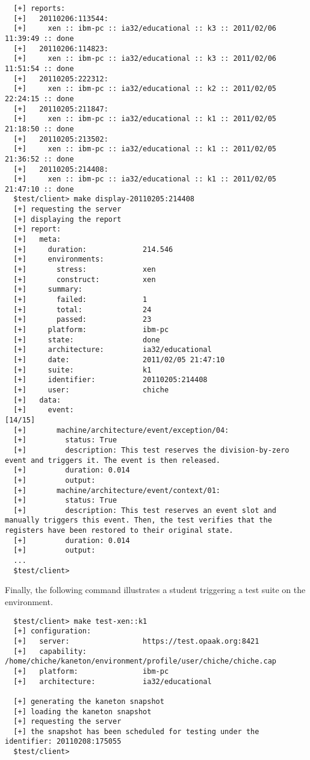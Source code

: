 \begin{verbatim}
  [+] reports:
  [+]   20110206:113544:
  [+]     xen :: ibm-pc :: ia32/educational :: k3 :: 2011/02/06 11:39:49 :: done
  [+]   20110206:114823:
  [+]     xen :: ibm-pc :: ia32/educational :: k3 :: 2011/02/06 11:51:54 :: done
  [+]   20110205:222312:
  [+]     xen :: ibm-pc :: ia32/educational :: k2 :: 2011/02/05 22:24:15 :: done
  [+]   20110205:211847:
  [+]     xen :: ibm-pc :: ia32/educational :: k1 :: 2011/02/05 21:18:50 :: done
  [+]   20110205:213502:
  [+]     xen :: ibm-pc :: ia32/educational :: k1 :: 2011/02/05 21:36:52 :: done
  [+]   20110205:214408:
  [+]     xen :: ibm-pc :: ia32/educational :: k1 :: 2011/02/05 21:47:10 :: done
  $test/client> make display-20110205:214408
  [+] requesting the server
  [+] displaying the report
  [+] report:
  [+]   meta:
  [+]     duration:             214.546
  [+]     environments:
  [+]       stress:             xen
  [+]       construct:          xen
  [+]     summary:
  [+]       failed:             1
  [+]       total:              24
  [+]       passed:             23
  [+]     platform:             ibm-pc
  [+]     state:                done
  [+]     architecture:         ia32/educational
  [+]     date:                 2011/02/05 21:47:10
  [+]     suite:                k1
  [+]     identifier:           20110205:214408
  [+]     user:                 chiche
  [+]   data:
  [+]     event:                                                          [14/15]
  [+]       machine/architecture/event/exception/04:
  [+]         status: True
  [+]         description: This test reserves the division-by-zero event and triggers it. The event is then released.
  [+]         duration: 0.014
  [+]         output: 
  [+]       machine/architecture/event/context/01:
  [+]         status: True
  [+]         description: This test reserves an event slot and manually triggers this event. Then, the test verifies that the registers have been restored to their original state.
  [+]         duration: 0.014
  [+]         output: 
  ...
  $test/client> 
\end{verbatim}

Finally, the following command illustrates a student triggering a test
suite on the  environment.

\begin{verbatim}
  $test/client> make test-xen::k1
  [+] configuration:
  [+]   server:                 https://test.opaak.org:8421
  [+]   capability:             /home/chiche/kaneton/environment/profile/user/chiche/chiche.cap
  [+]   platform:               ibm-pc
  [+]   architecture:           ia32/educational

  [+] generating the kaneton snapshot
  [+] loading the kaneton snapshot
  [+] requesting the server
  [+] the snapshot has been scheduled for testing under the identifier: 20110208:175055
  $test/client> 
\end{verbatim}

